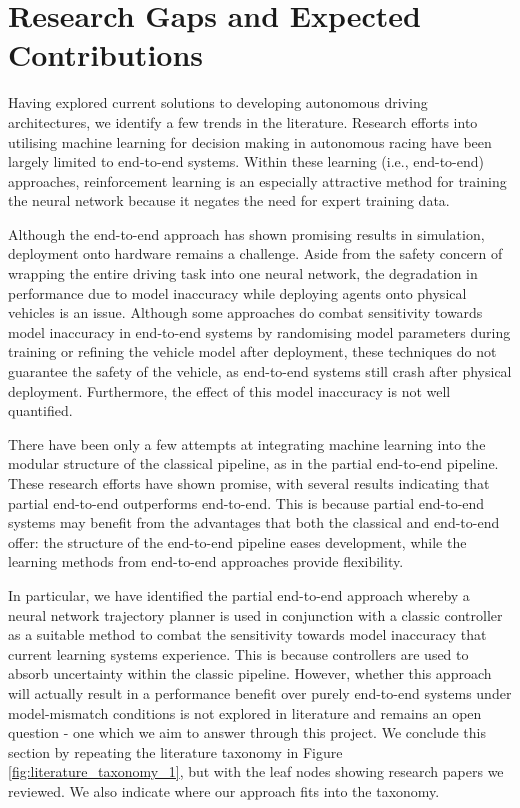 

\section{Research Gaps and Expected Contributions}
\label{research_gap}
Having explored current solutions to developing autonomous driving architectures, we identify a few trends in the literature.
Research efforts into utilising machine learning for decision making in autonomous racing have been largely limited to end-to-end systems. 
Within these learning (i.e., end-to-end) approaches, reinforcement learning is an especially attractive method for training the neural network because it negates the need for expert training data.

Although the end-to-end approach has shown promising results in simulation, deployment onto hardware remains a challenge.
Aside from the safety concern of wrapping the entire driving task into one neural network, the degradation in performance due to model inaccuracy while deploying agents onto physical vehicles is an issue.
Although some approaches do combat sensitivity towards model inaccuracy in end-to-end systems by randomising model parameters during training or refining the vehicle model after deployment, these techniques do not guarantee the safety of the vehicle, as end-to-end systems still crash after physical deployment.
Furthermore, the effect of this model inaccuracy is not well quantified.

There have been only a few attempts at integrating machine learning into the modular structure of the classical pipeline, as in the partial end-to-end pipeline.
These research efforts have shown promise, with several results indicating that partial end-to-end outperforms end-to-end.
This is because partial end-to-end systems may benefit from the advantages that both the classical and end-to-end offer: the structure of the end-to-end pipeline eases development, while the learning methods from end-to-end approaches provide flexibility.

In particular, we have identified the partial end-to-end approach whereby a neural network trajectory planner is used in conjunction with a classic controller as a suitable method to combat the sensitivity towards model inaccuracy that current learning systems experience.
This is because controllers are used to absorb uncertainty within the classic pipeline.
However, whether this approach will actually result in a performance benefit over purely end-to-end systems under model-mismatch conditions is not explored in literature and remains an open question - one which we aim to answer through this project.
We conclude this section by repeating the literature taxonomy in Figure \ref{fig:literature_taxonomy_1}, but with the leaf nodes showing research papers we reviewed. We also indicate where our approach fits into the taxonomy.

